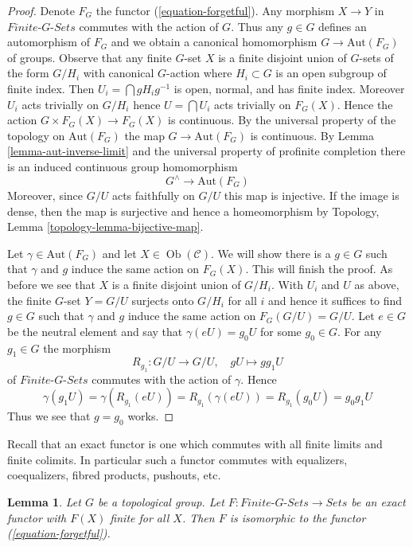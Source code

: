 \documentclass{stacks-project}
\theoremstyle{plain}
\newtheorem{lemma}[subsection]{Lemma}
\theoremstyle{definition}
\theoremstyle{remark}
\numberwithin{equation}{subsection}
\def\Ob{\mathop{\mathrm{Ob}}\nolimits}
\begin{document}
\begin{proof}
Denote $F_G$ the functor (\ref{equation-forgetful}). Any morphism
$X \to Y$ in $\textit{Finite-}G\textit{-Sets}$ commutes with the action
of $G$. Thus any $g \in G$ defines an automorphism of $F_G$ and
we obtain a canonical homomorphism $G \to \text{Aut}(F_G)$ of groups.
Observe that any finite $G$-set $X$ is a finite disjoint union of
$G$-sets of the form $G/H_i$ with canonical $G$-action where
$H_i \subset G$ is an open subgroup of finite index. Then
$U_i = \bigcap gH_ig^{-1}$ is open, normal, and has finite index.
Moreover $U_i$ acts trivially on $G/H_i$ hence
$U = \bigcap U_i$ acts trivially on $F_G(X)$. Hence the action
$G \times F_G(X) \to F_G(X)$ is continuous. By the universal
property of the topology on $\text{Aut}(F_G)$ the map
$G \to \text{Aut}(F_G)$ is continuous.
By Lemma \ref{lemma-aut-inverse-limit} and the universal property
of profinite completion there is an induced
continuous group homomorphism
$$
G^\wedge \longrightarrow \text{Aut}(F_G)
$$
Moreover, since $G/U$ acts faithfully on $G/U$ this map is
injective. If the image is dense, then the map is surjective and hence a
homeomorphism by Topology, Lemma \ref{topology-lemma-bijective-map}.

\medskip\noindent
Let $\gamma \in \text{Aut}(F_G)$ and let $X \in \Ob(\mathcal{C})$.
We will show there is a $g \in G$ such that $\gamma$ and $g$
induce the same action on $F_G(X)$. This will finish the proof.
As before we see that $X$ is a finite disjoint union of $G/H_i$.
With $U_i$ and $U$ as above, the finite $G$-set $Y = G/U$
surjects onto $G/H_i$ for all $i$ and hence it suffices to
find $g \in G$ such that $\gamma$ and $g$ induce the same action
on $F_G(G/U) = G/U$. Let $e \in G$ be the neutral element and
say that $\gamma(eU) = g_0U$ for some $g_0 \in G$. For any
$g_1 \in G$ the morphism
$$
R_{g_1} : G/U \longrightarrow G/U,\quad gU \longmapsto gg_1U
$$
of $\textit{Finite-}G\textit{-Sets}$ commutes with the action of
$\gamma$. Hence
$$
\gamma(g_1U) = \gamma(R_{g_1}(eU)) = R_{g_1}(\gamma(eU)) =
R_{g_1}(g_0U) = g_0g_1U
$$
Thus we see that $g = g_0$ works.
\end{proof}

\noindent
Recall that an exact functor is one which commutes with all
finite limits and finite colimits. In particular such a functor
commutes with equalizers, coequalizers, fibred products,
pushouts, etc.

\begin{lemma}
\label{lemma-second-fundamental-functor}
Let $G$ be a topological group. Let
$F : \textit{Finite-}G\textit{-Sets} \to \textit{Sets}$
be an exact functor with $F(X)$ finite for all $X$.
Then $F$ is isomorphic to the functor (\ref{equation-forgetful}).
\end{lemma}
\end{document}
